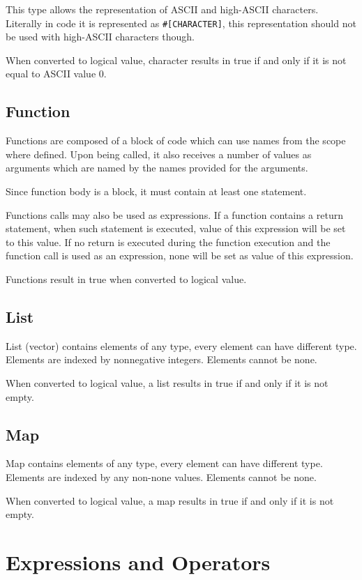 \documentclass[a4paper,11pt,openany]{article}
\begin{document}
This type allows the representation of ASCII and high-ASCII characters. Literally in code it is represented as \texttt{\#[CHARACTER]}, this representation should not be used with high-ASCII characters though.

When converted to logical value, character results in true if and only if it is not equal to ASCII value 0.

\subsection{Function}

Functions are composed of a block of code which can use names from the scope where defined. Upon being called, it also receives a number of values as arguments which are named by the names provided for the arguments.

Since function body is a block, it must contain at least one statement.

Functions calls may also be used as expressions. If a function contains a return statement, when such statement is executed, value of this expression will be set to this value. If no return is executed during the function execution and the function call is used as an expression, none will be set as value of this expression.

Functions result in true when converted to logical value.

\subsection{List}

List (vector) contains elements of any type, every element can have different type.
Elements are indexed by nonnegative integers. Elements cannot be none.

When converted to logical value, a list results in true if and only if it is not empty.

\subsection{Map}
	
Map contains elements of any type, every element can have different type.
Elements are indexed by any non-none values. Elements cannot be none.
	
When converted to logical value, a map results in true if and only if it is not empty.
	
\section{Expressions and Operators}
\end{document}
